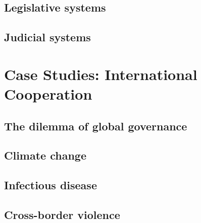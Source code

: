 \documentclass{tufte-book} %
\begin{document}
\section{Legislative systems}

\section{Judicial systems}


\chapter{Case Studies: International Cooperation}\label{ch:intl-coop}

\section{The dilemma of global governance}

\section{Climate change}

\section{Infectious disease}

\section{Cross-border violence}


\backmatter




\printindex %
\end{document}
